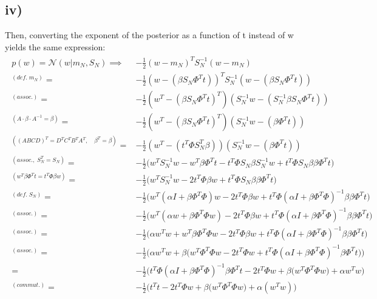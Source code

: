 \documentclass[11pt]{scrartcl} %
\begin{document}
         \subsection*{iv)}
         Then, converting the exponent of the posterior as a function of t instead of w yields the same expression:
         \begin{align*}
           \begin{aligned}
             p(w) = \mathcal{N}(w|m_N, S_N) \implies &-\frac{1}{2} (w-m_N)^T S_N^{-1} (w-m_N) \\
             ^{(def.\; m_N)}= &-\frac{1}{2} (w-(\beta S_N \Phi^Tt))^T S_N^{-1} (w-(\beta S_N \Phi^Tt)) \\ %
             ^{(assoc.)}= &-\frac{1}{2} (w^T-(\beta S_N \Phi^Tt)^T) (S_N^{-1}w-(S_N^{-1}\beta S_N \Phi^Tt)) \\
             ^{(A\cdot\beta\cdot A^{-1}=\beta)}= &-\frac{1}{2} (w^T-(\beta S_N \Phi^Tt)^T) (S_N^{-1}w-(\beta \Phi^Tt)) \\
             ^{((ABCD)^T=D^TC^TB^TA^T,\quad \beta^T=\beta)}= &-\frac{1}{2} (w^T-(t^T\Phi S_N^T \beta)) (S_N^{-1}w-(\beta \Phi^Tt)) \\
             ^{(assoc.,\; S_N^T=S_N)}= &-\frac{1}{2} \Big( w^TS_N^{-1}w-w^T\beta \Phi^Tt  - t^T\Phi S_N \beta S_N^{-1}w + t^T\Phi S_N \beta \beta \Phi^Tt \Big) \\
             ^{(w^T\beta\Phi^Tt=t^T\Phi\beta w)}= &-\frac{1}{2} \Big( w^TS_N^{-1}w - 2t^T\Phi\beta w   + t^T\Phi S_N \beta \beta \Phi^Tt \Big) \\
             ^{(def.\; S_N)}= &-\frac{1}{2} \Big( w^T(\alpha I + \beta \Phi^T\Phi)w - 2t^T\Phi\beta w   + t^T\Phi (\alpha I + \beta \Phi^T\Phi)^{-1} \beta \beta \Phi^Tt \Big) \\
             ^{(assoc.)}= &-\frac{1}{2} \Big( w^T(\alpha w + \beta \Phi^T\Phi w) - 2t^T\Phi\beta w   + t^T\Phi (\alpha I + \beta \Phi^T\Phi)^{-1} \beta \beta \Phi^Tt \Big) \\
             ^{(assoc.)}= &-\frac{1}{2} \Big( \alpha w^Tw + w^T\beta \Phi^T\Phi w - 2t^T\Phi\beta w   + t^T\Phi (\alpha I + \beta \Phi^T\Phi)^{-1} \beta \beta \Phi^Tt \Big) \\
             ^{(assoc.)}= &-\frac{1}{2} \Big( \alpha w^Tw + \beta \big(w^T\Phi^T\Phi w - 2t^T\Phi w   + t^T\Phi (\alpha I + \beta \Phi^T\Phi)^{-1} \beta \Phi^Tt \big) \Big) \\
             = &-\frac{1}{2} \Big(t^T\Phi (\alpha I + \beta \Phi^T\Phi)^{-1} \beta \Phi^Tt \big  - 2t^T\Phi w   + \beta \big(w^T\Phi^T\Phi w ) +  \alpha w^Tw\Big) \\
             ^{(commut.)}= &-\frac{1}{2} \Big(t^Tt \big  - 2t^T\Phi w   + \beta \big(w^T\Phi^T\Phi w ) +  \alpha(w^Tw)\Big) \\
           \end{aligned}
         \end{align*}
\end{document}
